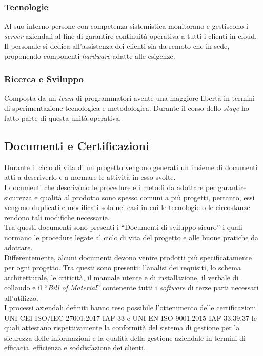 \subsubsection*{Tecnologie}
Al suo interno persone con competenza sistemistica monitorano e gestiscono i \emph{server} aziendali al fine di garantire continuità operativa a tutti i clienti in \gls{cloud}. Il personale si dedica all'assistenza dei clienti sia da remoto che in sede, proponendo componenti \emph{hardware} adatte alle esigenze.
\subsubsection*{Ricerca e Sviluppo}
Composta da un \emph{team} di programmatori avente una maggiore libertà in termini di sperimentazione tecnologica e metodologica. Durante il corso dello \emph{stage} ho fatto parte di questa unità operativa.\\

\subsection{Documenti e Certificazioni}
Durante il ciclo di vita di un progetto vengono generati un insieme di documenti atti a descriverlo e a normare le attività in esso svolte.\\
I documenti che descrivono le procedure e i metodi da adottare per garantire sicurezza e qualità al prodotto sono spesso comuni a più progetti, pertanto, essi vengono duplicati e modificati solo nei casi in cui le tecnologie o le circostanze rendono tali modifiche necessarie.\\
Tra questi documenti sono presenti i “Documenti di sviluppo sicuro” i quali normano le procedure legate al ciclo di vita del progetto e alle buone pratiche da adottare.\\ 
Differentemente, alcuni documenti devono venire prodotti più specificatamente per ogni progetto. Tra questi sono presenti: l'analisi dei requisiti, lo schema architetturale, le criticità, il manuale utente e di installazione, il verbale di collaudo e il “\emph{Bill of Material}” contenente tutti i \emph{software} di terze parti necessari all'utilizzo.\\
I processi aziendali definiti hanno reso possibile l'ottenimento delle certificazioni UNI CEI ISO/IEC 27001:2017 IAF 33 e UNI EN ISO 9001:2015 IAF 33,39,37 le quali attestano rispettivamente la conformità del sistema di gestione per la sicurezza delle informazioni e la qualità della gestione aziendale in termini di efficacia, efficienza e soddisfazione dei clienti.\\


